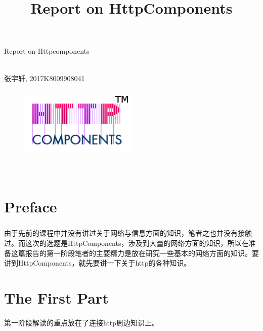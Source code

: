\documentclass{article}
\begin{document}
	\title{Report on HttpComponents}  %
	\begin{center}
		\huge Report on Httpcomponents\\
		\hspace*{\fill} \\ %
		\begin{CJK}{UTF8}{gbsn}
			\normalsize 张宇轩, 2017K8009908041\\
		\end{CJK}{}
	\end{center}
	\begin{figure}[H]
		\centering
		\includegraphics[height = 3.5cm, width = 5.5cm]{pics/1_httpcomponents.png}	
	\end{figure}

	\hspace*{\fill} \\ %
	
	\tableofcontents{} %
	\clearpage
	\section{Preface}
	\subparagraph{}
	\begin{CJK}{UTF8}{gbsn}
		由于先前的课程中并没有讲过关于网络与信息方面的知识，笔者之也并没有接触过。而这次的选题是HttpComponents，涉及到大量的网络方面的知识，所以在准备这篇报告的第一阶段笔者的主要精力是放在研究一些基本的网络方面的知识。要讲到HttpComponents，就先要讲一下关于http的各种知识。
	\end{CJK}{}
	\clearpage
	
	
	\section{The First Part}
	\paragraph{}
	\indent \indent 
	\begin{CJK}{UTF8}{gbsn}
		第一阶段解读的重点放在了连接http周边知识上。  
	\end{CJK}{}
\end{document}
